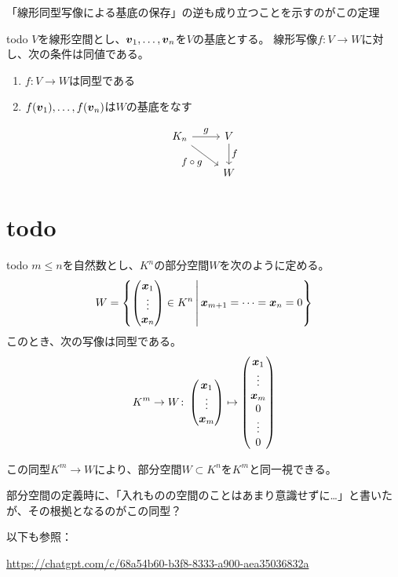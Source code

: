 \documentclass[../../../topic_linear-algebra]{subfiles}
\begin{document}
\begin{mindflow}
  「線形同型写像による基底の保存」の逆も成り立つことを示すのがこの定理
\end{mindflow}

\begin{theorem*}{todo}
  $V$を線形空間とし、$\vb*{v}_1, \ldots, \vb*{v}_n$を$V$の基底とする。
  線形写像$f \colon V \to W$に対し、次の条件は同値である。
  \begin{enumerate}[label=\romanlabel]
    \item $f\colon V \to W$は同型である
    \item $f(\vb*{v}_1), \ldots, f(\vb*{v}_n)$は$W$の基底をなす
  \end{enumerate}
\end{theorem*}

\begin{equation*}
  \begin{tikzcd}[every label/.append style = {font = \small}]
    K_n \arrow[r,"g"]\arrow[rd, "f \circ g"'] & V \arrow[d,"f"]\\
    & W
  \end{tikzcd}
\end{equation*}

\sectionline
\section{todo}

\begin{theorem*}{todo}
  $m \leq n$を自然数とし、$K^n$の部分空間$W$を次のように定める。
  \begin{equation*}
    W = \left\{ \begin{pmatrix}
      \vb*{x}_1 \\ \vdots \\ \vb*{x}_n
    \end{pmatrix} \in K^n \,\middle|\,
    \begin{gathered} 
      \vb*{x}_{m+1} = \cdots = \vb*{x}_n = 0
    \end{gathered}
    \right\}
  \end{equation*}
  このとき、次の写像は同型である。
  \begin{equation*}
    K^m \to W \colon \begin{pmatrix}
      \vb*{x}_1 \\ \vdots \\ \vb*{x}_m
    \end{pmatrix} \mapsto \begin{pmatrix}
      \vb*{x}_1 \\ \vdots \\ \vb*{x}_m \\ 0 \\ \vdots \\ 0
    \end{pmatrix}
  \end{equation*}
\end{theorem*}

この同型$K^m \to W$により、部分空間$W \subset K^n$を$K^m$と同一視できる。

\begin{mindflow}
  部分空間の定義時に、「入れものの空間のことはあまり意識せずに…」と書いたが、その根拠となるのがこの同型？
  
  以下も参照：
  
  \url{https://chatgpt.com/c/68a54b60-b3f8-8333-a900-aea35036832a}
\end{mindflow}
\end{document}
